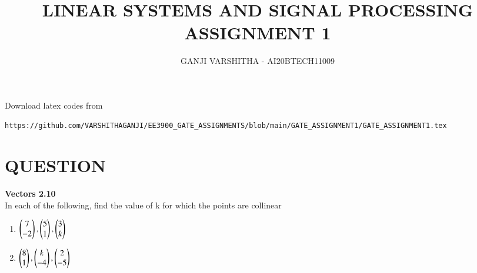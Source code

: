 \documentclass[journal,12pt,twocolumn]{IEEEtran}
\begin{document}
\let\vec\mathbf
\renewcommand{\thefigure}{\theproblem}
\def\putbox#1#2#3{\makebox[0in][l]{\makebox[#1][l]{}\raisebox{\baselineskip}[0in][0in]{\raisebox{#2}[0in][0in]{#3}}}}
     \def\rightbox#1{\makebox[0in][r]{#1}}
     \def\centbox#1{\makebox[0in]{#1}}
     \def\topbox#1{\raisebox{-\baselineskip}[0in][0in]{#1}}
     \def\midbox#1{\raisebox{-0.5\baselineskip}[0in][0in]{#1}}
\vspace{3cm}
\title{\textbf{LINEAR SYSTEMS AND SIGNAL PROCESSING \\ ASSIGNMENT 1}}
\author{GANJI VARSHITHA - AI20BTECH11009}
\maketitle
\newpage
\bigskip
\renewcommand{\thefigure}{\arabic{figure}}
\renewcommand{\thetable}{\arabic{table}}
Download latex codes from 
%
\begin{lstlisting}
https://github.com/VARSHITHAGANJI/EE3900_GATE_ASSIGNMENTS/blob/main/GATE_ASSIGNMENT1/GATE_ASSIGNMENT1.tex
\end{lstlisting}
\section*{QUESTION}
\textbf{Vectors 2.10}
\\
In each of the following, find the value of k for which the points are collinear

\begin{enumerate}
   \item  $\begin{pmatrix}7\\-2\end{pmatrix}, \begin{pmatrix}5 \\ 1\end{pmatrix}, \begin{pmatrix}3 \\ k\end{pmatrix}$
   \item  $\begin{pmatrix}8\\1\end{pmatrix}, \begin{pmatrix}k \\ -4\end{pmatrix}, \begin{pmatrix}2 \\ -5\end{pmatrix}$
 
\end{enumerate}
\end{document}
